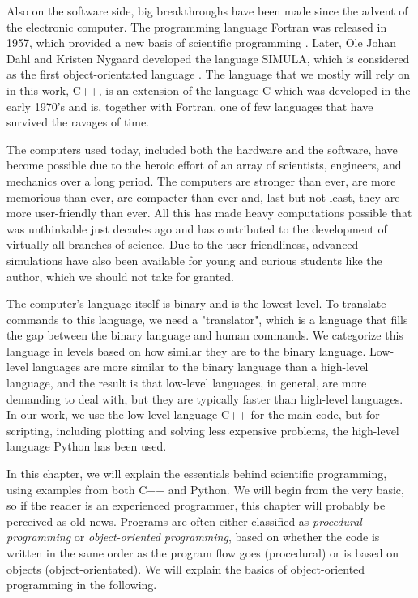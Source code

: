 Also on the software side, big breakthroughs have been made since the advent of the electronic computer. The programming language Fortran was released in 1957, which provided a new basis of scientific programming \cite{allen_history_1981}. Later, Ole Johan Dahl and Kristen Nygaard developed the language SIMULA, which is considered as the first object-orientated language \cite{holmevik_compiling_1994}. The language that we mostly will rely on in this work, C++, is an extension of the language C which was developed in the early 1970's and is, together with Fortran, one of few languages that have survived the ravages of time. 

The computers used today, included both the hardware and the software, have become possible due to the heroic effort of an array of scientists, engineers, and mechanics over a long period. The computers are stronger than ever, are more memorious than ever, are compacter than ever and, last but not least, they are more user-friendly than ever. All this has made heavy computations possible that was unthinkable just decades ago and has contributed to the development of virtually all branches of science. Due to the user-friendliness, advanced simulations have also been available for young and curious students like the author, which we should not take for granted. 

The computer's language itself is binary and is the lowest level. To translate commands to this language, we need a "translator", which is a language that fills the gap between the binary language and human commands. We categorize this language in levels based on how similar they are to the binary language. Low-level languages are more similar to the binary language than a high-level language, and the result is that low-level languages, in general, are more demanding to deal with, but they are typically faster than high-level languages. In our work, we use the low-level language C++ for the main code, but for scripting, including plotting and solving less expensive problems, the high-level language Python has been used. 

In this chapter, we will explain the essentials behind scientific programming, using examples from both C++ and Python. We will begin from the very basic, so if the reader is an experienced programmer, this chapter will probably be perceived as old news. Programs are often either classified as \textit{procedural programming} or \textit{object-oriented programming}, based on whether the code is written in the same order as the program flow goes (procedural) or is based on objects (object-orientated). We will explain the basics of object-oriented programming in the following.

